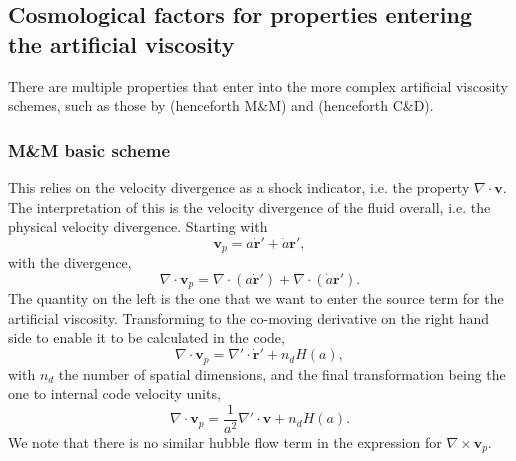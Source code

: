 \subsection{Cosmological factors for properties entering the artificial viscosity}
\label{ssec:artificialvisc}

There are multiple properties that enter into the more complex artificial
viscosity schemes, such as those by \citet{Morris1997} (henceforth M\&M) and
\citet{Cullen2010} (henceforth C\&D).

\subsubsection{M\&M basic scheme}
\label{sssec:mandm}

This relies on the velocity divergence as a shock indicator, i.e. the property
$\nabla \cdot \mathbf{v}$. The interpretation of this is the velocity divergence of
the fluid overall, i.e. the physical velocity divergence. Starting with
\begin{equation}
\mathbf{v}_p = a \dot{\mathbf{r}}' + \dot{a} \mathbf{r}', \nonumber
\end{equation}
with the divergence,
\begin{equation}
\nabla \cdot \mathbf{v}_p =
    \nabla \cdot \left(a \dot{\mathbf{r}}'\right) +
    \nabla \cdot \left(\dot{a} \mathbf{r}'\right). \nonumber
\end{equation}
The quantity on the left is the one that we want to enter the source term for the
artificial viscosity. Transforming to the co-moving derivative on the right hand side
to enable it to be calculated in the code,
\begin{equation}
\nabla \cdot \mathbf{v}_p = 
    \nabla' \cdot \dot{\mathbf{r}}' + n_d H(a),
\label{eqn:divvwithcomovingcoordinates}
\end{equation}
with $n_d$ the number of spatial dimensions, and the final transformation
being the one to internal code velocity units,
\begin{equation}
\nabla \cdot \mathbf{v}_p = 
    \frac{1}{a^2} \nabla' \cdot \mathbf{v} + n_d H(a).
\label{eqn:divvcodeunits}
\end{equation}
We note that there is no similar hubble flow term in the expression for
$\nabla \times \mathbf{v}_p$.